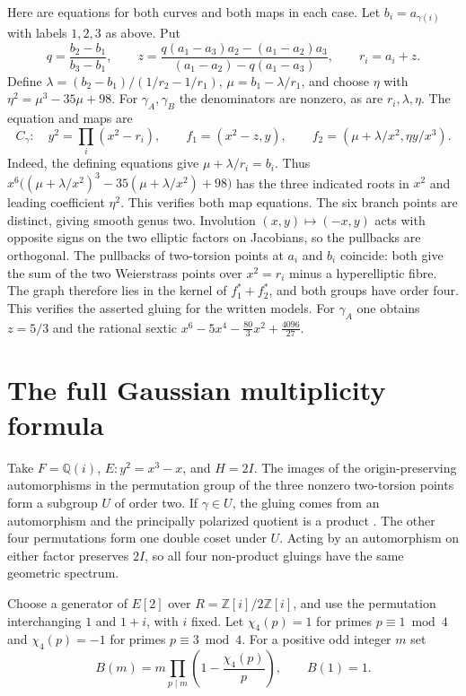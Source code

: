 \documentclass[11pt,letterpaper]{amsart}
\theoremstyle{definition}
\numberwithin{equation}{section}
\newcommand{\Q}{\mathbb Q}
\newcommand{\Z}{\mathbb Z}
\begin{document}
Here are equations for both curves and both maps in each case.
Let \(b_i=a_{\gamma(i)}\) with labels \(1,2,3\) as above. Put
\[
 q=\frac{b_2-b_1}{b_3-b_1},\qquad
 z=\frac{q(a_1-a_3)a_2-(a_1-a_2)a_3}{(a_1-a_2)-q(a_1-a_3)},
 \qquad r_i=a_i+z.
\]
Define \(\lambda=(b_2-b_1)/(1/r_2-1/r_1)\),
\(\mu=b_1-\lambda/r_1\), and choose \(\eta\) with
\(\eta^2=\mu^3-35\mu+98\). For \(\gamma_A,\gamma_B\) the
denominators are nonzero, as are \(r_i,\lambda,\eta\). The equation
and maps are
\begin{equation}\label{eq:models}
 C_\gamma:\quad y^2=\prod_i(x^2-r_i),\qquad
 f_1=(x^2-z,y),\qquad f_2=(\mu+\lambda/x^2,\eta y/x^3).
\end{equation}
Indeed, the defining equations give \(\mu+\lambda/r_i=b_i\).
Thus \(x^6\bigl((\mu+\lambda/x^2)^3-35(\mu+\lambda/x^2)+98\bigr)\)
has the three indicated roots in \(x^2\) and leading coefficient
\(\eta^2\). This verifies both map equations. The six branch
points are distinct, giving smooth genus two. Involution
\((x,y)\mapsto(-x,y)\) acts with opposite signs on the two elliptic
factors on Jacobians, so the pullbacks are orthogonal. The
pullbacks of two-torsion points at \(a_i\) and \(b_i\) coincide:
both give the sum of the two Weierstrass points over \(x^2=r_i\)
minus a hyperelliptic fibre. The graph therefore lies in the kernel
of \(f_1^*+f_2^*\), and both groups have order four. This verifies
the asserted gluing for the written models. For \(\gamma_A\) one
obtains \(z=5/3\) and the rational sextic
\(x^6-5x^4-\frac{80}{3}x^2+\frac{4096}{27}\).

\section{The full Gaussian multiplicity formula}\label{sec:gaussian}

Take \(F=\Q(i)\), \(E:y^2=x^3-x\), and \(H=2I\).
The images of the origin-preserving automorphisms in the permutation
group of the three nonzero two-torsion points form a subgroup
\(U\) of order two. If \(\gamma\in U\), the gluing comes from an
automorphism and the principally polarized quotient is a product
\cite{HLP}. The other four permutations form one double coset under
\(U\). Acting by an automorphism on either factor preserves \(2I\),
so all four non-product gluings have the same geometric spectrum.

Choose a generator of \(E[2]\) over \(R=\Z[i]/2\Z[i]\), and use the
permutation interchanging \(1\) and \(1+i\), with \(i\) fixed.
Let \(\chi_4(p)=1\) for primes \(p\equiv1\bmod4\) and
\(\chi_4(p)=-1\) for primes \(p\equiv3\bmod4\). For a positive odd
integer \(m\) set
\[
 B(m)=m\prod_{p\mid m}\left(1-\frac{\chi_4(p)}{p}\right),\qquad B(1)=1.
\]
\end{document}
